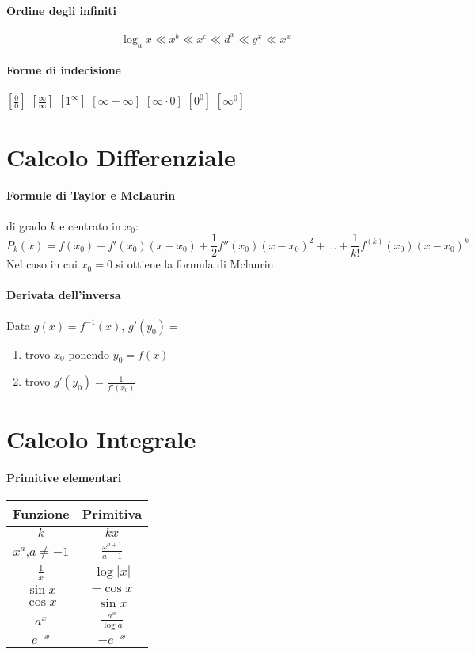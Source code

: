 \documentclass[12pt, a4paper, openany]{article}
\begin{document}
	\paragraph*{Ordine degli infiniti}
	$$ \log_ax\ll x^b\ll x^c\ll d^x\ll g^x\ll x^x $$


	\paragraph*{Forme di indecisione}
$[\frac{0}{0}]$ $[\frac{\infty}{\infty}]$ $[1^\infty]$ $[\infty - \infty]$ $[\infty \cdot 0]$ $[0^0]$ $[\infty^0]$

	\section*{Calcolo Differenziale}
	\paragraph*{Formule di Taylor e McLaurin} di grado $k$ e centrato in $x_0$:
	$$P_k(x)=f(x_0)+f'(x_0)(x-x_0) + \frac{1}{2}f''(x_0)(x-x_0)^2 +... + \frac{1}{k!}f^{(k)}(x_0)(x-x_0)^k$$
	Nel caso in cui $x_0=0$ si ottiene la formula di Mclaurin.
	\paragraph*{Derivata dell'inversa} Data $g(x) = f^{-1}(x)$, $g'(y_0)=$
\begin{enumerate}
	\item trovo $x_0$ ponendo $y_0=f(x)$
	\item trovo $g'(y_0)=\frac{1}{f'(x_0)}$
\end{enumerate}


\section*{Calcolo Integrale}
\paragraph*{Primitive elementari}
\begin{tabular}{ |c|c| }
	\hline
	Funzione        & Primitiva             \\
	\hline
	$k$             & $kx$                  \\
	$x^a$,$a\neq-1$ & $\frac{x^{a+1}}{a+1}$ \\
	$\frac{1}{x}$   & $\log|x|$             \\
	$\sin x$        & $-\cos x$             \\
	$\cos x $       & $\sin x$              \\
	$a^x$           & $\frac{a^x}{\log a}$  \\
	\hline
	$e^{-x}$        & $-e^{-x}$             \\
	\hline
\end{tabular}
\end{document}
